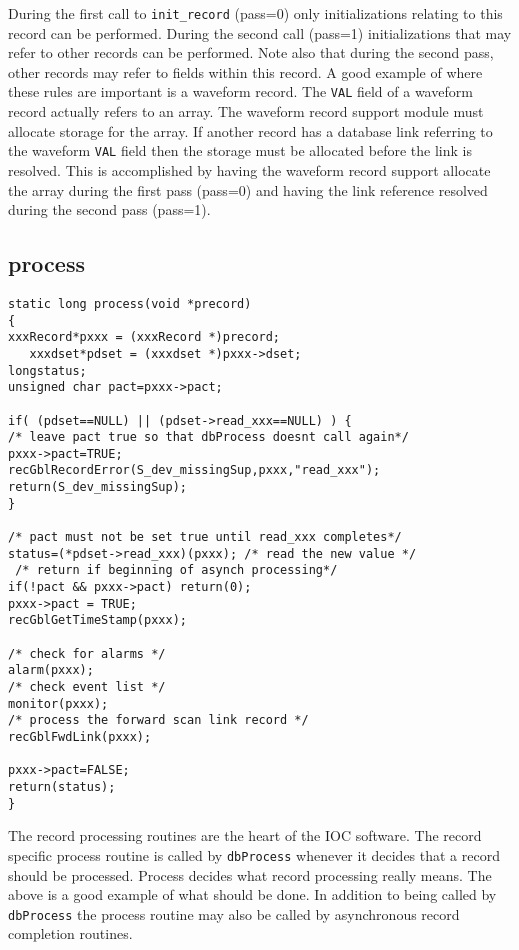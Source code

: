 During the first call to \verb|init_record| (pass=0) only initializations relating to this record can be performed. During the 
second call (pass=1) initializations that may refer to other records can be performed. Note also that during the second 
pass, other records may refer to fields within this record. A good example of where these rules are important is a 
waveform record. The \verb|VAL| field of a waveform record actually refers to an array. The waveform record support module 
must allocate storage for the array. If another record has a database link referring to the waveform \verb|VAL| field then the 
storage must be allocated before the link is resolved. This is accomplished by having the waveform record support 
allocate the array during the first pass (pass=0) and having the link reference resolved during the second pass (pass=1).

\subsection{process}

\begin{verbatim}static long process(void *precord)
{
xxxRecord*pxxx = (xxxRecord *)precord;
   xxxdset*pdset = (xxxdset *)pxxx->dset;
longstatus;
unsigned char pact=pxxx->pact;

if( (pdset==NULL) || (pdset->read_xxx==NULL) ) {
/* leave pact true so that dbProcess doesnt call again*/
pxxx->pact=TRUE;
recGblRecordError(S_dev_missingSup,pxxx,"read_xxx");
return(S_dev_missingSup);
}

/* pact must not be set true until read_xxx completes*/
status=(*pdset->read_xxx)(pxxx); /* read the new value */
 /* return if beginning of asynch processing*/
if(!pact && pxxx->pact) return(0);
pxxx->pact = TRUE;
recGblGetTimeStamp(pxxx);

/* check for alarms */
alarm(pxxx);
/* check event list */
monitor(pxxx);
/* process the forward scan link record */
recGblFwdLink(pxxx);

pxxx->pact=FALSE;
return(status);
}
\end{verbatim}The record processing routines are the heart of the IOC software. The record specific process routine is called by 
\verb|dbProcess| whenever it decides that a record should be processed. Process decides what record processing really means. 
The above is a good example of what should be done. In addition to being called by \verb|dbProcess| the process routine may 
also be called by asynchronous record completion routines.

